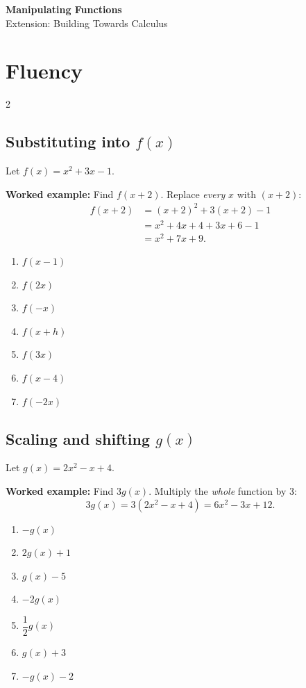 \documentclass[11pt]{article}
\newcommand{\ans}{\hrulefill}
\newcommand{\anshere}{\par\vspace{0.3em}\noindent\ans\par\vspace{0.3em}}
\begin{document}
\thispagestyle{firstpage}

\begin{center}
  {\Large\bfseries Manipulating Functions}\\[2pt]
  {\normalsize Extension: Building Towards Calculus}
\end{center}
\vspace{0.2em}

\section*{Fluency}

\begin{multicols}{2}
\subsection*{Substituting into $f(x)$}
\noindent Let $f(x) = x^2+3x-1$.
\vspace{0.2em}

\noindent\textbf{Worked example:} Find $f(x+2)$. Replace \emph{every} $x$ with $(x+2)$:
\begin{align*}
  f(x+2) &= (x+2)^2+3(x+2)-1 \\
         &= x^2+4x+4+3x+6-1 \\
         &= x^2+7x+9.
\end{align*}
\vspace{0.2em}
\begin{enumerate}[label=(\alph*)]
  \item $f(x-1)$
  \anshere
  \item $f(2x)$
  \anshere
  \item $f(-x)$
  \anshere
  \item $f(x+h)$
  \anshere
  \item $f(3x)$
  \anshere
  \item $f(x-4)$
  \anshere
  \item $f(-2x)$
  \anshere
\end{enumerate}

\columnbreak

\subsection*{Scaling and shifting $g(x)$}
\noindent Let $g(x) = 2x^2-x+4$.
\vspace{0.2em}

\noindent\textbf{Worked example:} Find $3g(x)$. Multiply the \emph{whole} function by $3$:
\[
  3g(x) = 3(2x^2-x+4) = 6x^2-3x+12.
\]
\vspace{0.2em}
\begin{enumerate}[label=(\alph*)]
  \item $-g(x)$
  \anshere
  \item $2g(x)+1$
  \anshere
  \item $g(x)-5$
  \anshere
  \item $-2g(x)$
  \anshere
  \item $\dfrac{1}{2}g(x)$
  \anshere
  \item $g(x)+3$
  \anshere
  \item $-g(x)-2$
  \anshere
\end{enumerate}
\end{multicols}
\end{document}

